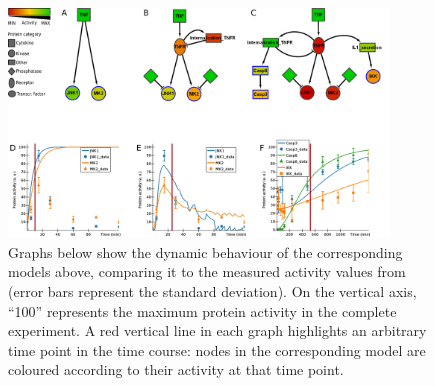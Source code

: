 \documentclass{bmcart}
\begin{document}
\begin{figure}[!htbp]
\centering
  \includegraphics[width=0.9\textwidth]{images/small_model_completa}
  \caption{
Graphs below show the dynamic behaviour of the corresponding models above, comparing it to the measured
activity values from~\cite{pathway-compendium} (error bars represent the standard deviation).
On the vertical axis, ``100'' represents the maximum protein activity in the complete experiment.
A red vertical line in each graph highlights an arbitrary time point in the time course:
nodes in the corresponding model are coloured according to their activity at that time point.
}
\end{figure}
\end{document}
